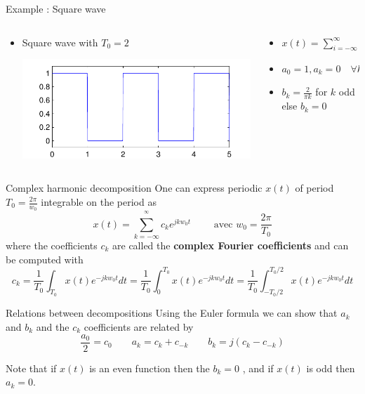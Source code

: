 \begin{exampleblock}{Example : Square wave}
    \begin{columns}
      \begin{column}{5cm}
        \begin{itemize}
        \item Square wave with $T_0=2$

      \includegraphics[width=.5\columnwidth]{imgs/fourier/sig_creneau}
        \end{itemize}
      \end{column}
      \begin{column}{6cm}
        \begin{itemize}
        \item $x(t)=\sum_{i=-\infty}^\infty 1_{[iT_0,iT_0+T_0/2 ]}(t)$
        \item $a_0=1, a_k=0 \quad \forall k >0$
        \item $b_k=\frac{2}{\pi k}$ for $k$ odd else $b_k=0$
        \end{itemize}
      \end{column}
    \end{columns}
  \end{exampleblock}

    
 \begin{block}{Complex harmonic decomposition}
    One can express periodic $x(t)$ of period $T_0=\frac{2\pi}{w_0}$ integrable on the period as
  $$
  x(t) = \sum_{k=-\infty}^{^\infty}  c_k  e^{jkw_0t} \quad \quad \text{ avec }
  w_0= \frac{2 \pi }{T_0}
  $$
  where the coefficients $c_k$ are called the  \textbf{complex Fourier coefficients} and can be computed with
  $$
  c_k = \frac{1}{T_0} \int_{T_0} x(t) e^{-j k w_0t}dt = \frac{1}{T_0} \int_{0}^{T_0} x(t) e^{-j k w_0t}dt = \frac{1}{T_0} \int_{-T_0/2}^{T_0/2} x(t) e^{-j k w_0t}dt
  $$
    \end{block}
  \vspace{-5mm}
    \begin{block}{Relations between decompositions}
     Using the Euler formula we can show that $a_k$ and $b_k$ and the $c_k$ coefficients are related by
  $$
  \frac{a_0}{2}= c_0 \quad \quad a_k = c_k + c_{-k} \quad \quad b_k =
  j(c_k - c_{-k})
  $$
  
  Note that if $x(t)$ is an even function then the
  $b_k=0$ , and if $x(t)$ is odd then $a_k=0$.
    \end{block}

